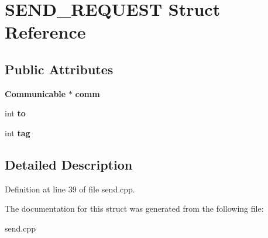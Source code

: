 \section{SEND\_\-REQUEST Struct Reference}
\label{struct_s_e_n_d___r_e_q_u_e_s_t}
\subsection*{Public Attributes}
\begin{CompactItemize}
\item 
{\bf Communicable} $\ast$ {\bf comm}\label{struct_s_e_n_d___r_e_q_u_e_s_t_1ad8f7233fa3ff13262e783a9153920f}

\item 
int {\bf to}\label{struct_s_e_n_d___r_e_q_u_e_s_t_93e2a6a71d2a91aa2b7bdd050ee59b4d}

\item 
int {\bf tag}\label{struct_s_e_n_d___r_e_q_u_e_s_t_3126b3ef9d6533d3086760e413a7f23f}

\end{CompactItemize}


\subsection{Detailed Description}




Definition at line 39 of file send.cpp.

The documentation for this struct was generated from the following file:\begin{CompactItemize}
\item 
send.cpp\end{CompactItemize}
